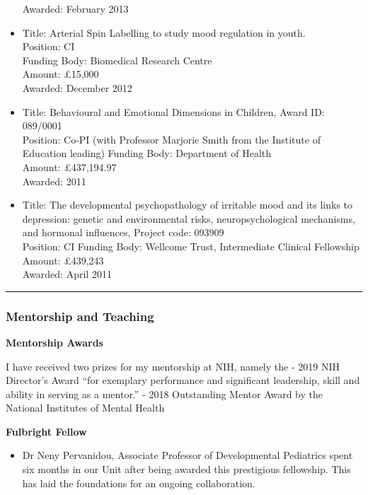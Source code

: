 \documentclass[
]{article}
\providecommand{\tightlist}{%
  \setlength{\itemsep}{0pt}\setlength{\parskip}{0pt}}
\begin{document}
\begin{itemize}
  Awarded: February 2013
\item
  Title: Arterial Spin Labelling to study mood regulation in youth.\\
  Position: CI\\
  Funding Body: Biomedical Research Centre\\
  Amount: £15,000\\
  Awarded: December 2012
\item
  Title: Behavioural and Emotional Dimensions in Children, Award ID:
  089/0001\\
  Position: Co-PI (with Professor Marjorie Smith from the Institute of
  Education leading) Funding Body: Department of Health\\
  Amount: £437,194.97\\
  Awarded: 2011
\item
  Title: The developmental psychopathology of irritable mood and its
  links to depression: genetic and environmental risks,
  neuropsychological mechanisms, and hormonal influences, Project code:
  093909\\
  Position: CI Funding Body: Wellcome Trust, Intermediate Clinical
  Fellowship\\
  Amount: £439,243\\
  Awarded: April 2011
\end{itemize}

\begin{center}\rule{0.5\linewidth}{0.5pt}\end{center}

\hypertarget{mentorship-and-teaching}{%
\subsubsection{Mentorship and Teaching}\label{mentorship-and-teaching}}

\textbf{Mentorship Awards}

I have received two prizes for my mentorship at NIH, namely the - 2019
NIH Director's Award ``for exemplary performance and significant
leadership, skill and ability in serving as a mentor.'' - 2018
Outstanding Mentor Award by the National Institutes of Mental Health

\textbf{Fulbright Fellow}

\begin{itemize}
\tightlist
\item
  Dr Neny Pervanidou, Associate Professor of Developmental Pediatrics
  spent six months in our Unit after being awarded this prestigious
  fellowship. This has laid the foundations for an ongoing
  collaboration.
\end{itemize}
\end{document}

